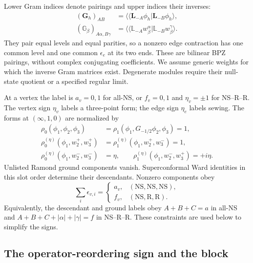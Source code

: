 \documentclass[11pt]{article}
\newcommand{\NS}{\mathrm{NS}}
\newcommand{\R}{\mathrm R}
\numberwithin{equation}{section}
\begin{document}
Lower Gram indices denote pairings and upper indices their inverses:
\begin{align}
 (\mathbf G_h)_{AB}
 &=\langle\!\langle\mathbf L_{-A}\phi_h|
                                     \mathbf L_{-B}\phi_h\rangle,
 \nonumber\\
 (\mathbb G_\beta)_{A\alpha,B\gamma}
 &=\langle\!\langle\mathbb L_{-A}w_\beta^\alpha|
                                     \mathbb L_{-B}w_\beta^\gamma\rangle.
 \label{eq:physical-metric}
\end{align}
They pair equal levels and equal parities, so a nonzero edge contraction
has one common level and one common $\epsilon_e$ at its two ends.
These are bilinear BPZ pairings, without complex conjugating coefficients.
We assume generic weights for which the inverse Gram matrices exist.
Degenerate modules require their null-state quotient or a specified
regular limit.

At a vertex the label is $a_v=0,1$ for all-NS, or
$f_v=0,1$ and $\eta_v=\pm1$ for NS--R--R. The vertex sign $\eta_v$
labels a three-point form; the edge sign $\eta_e$ labels sewing.
The forms at $(\infty,1,0)$ are normalized by
\begin{align}
 \rho_0(\phi_1,\phi_2,\phi_3)
 &=\rho_1(\phi_1,G_{-1/2}\phi_2,\phi_3)=1,\nonumber\\
 \rho_0^{(\eta)}(\phi_1,w_2^+,w_3^+)
 &=\rho_1^{(\eta)}(\phi_1,w_2^+,w_3^-)=1,\nonumber\\
 \rho_0^{(\eta)}(\phi_1,w_2^-,w_3^-)&=\eta,
 \qquad\rho_1^{(\eta)}(\phi_1,w_2^-,w_3^+)=+i\eta.
 \label{eq:physical-vertices}
\end{align}
Unlisted Ramond ground components vanish. Superconformal Ward identities
in this slot order determine their descendants. Nonzero components obey
\begin{equation}
 \sum_i\epsilon_{v,i}
 =\begin{cases}a_v,&(\NS,\NS,\NS),\\
                f_v,&(\NS,\R,\R).
   \end{cases}
 \label{eq:vertex-selection}
\end{equation}
Equivalently, the descendant and ground labels obey $A+B+C=a$ in all-NS
and $A+B+C+|\alpha|+|\gamma|=f$ in NS--R--R. These constraints are
used below to simplify the signs.

\subsection{The operator-reordering sign and the block}
\end{document}
